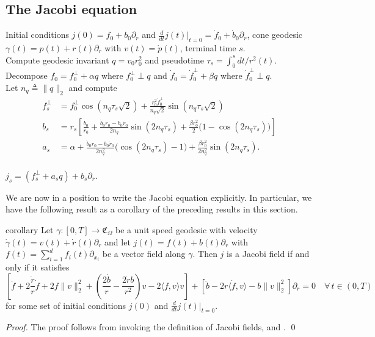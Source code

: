 \documentclass[11pt]{article}
\begin{document}
\subsection{The Jacobi equation}


\begin{algorithm}[H]
    \begin{algorithmic}[1]
        \caption{Jacobi field on $\mathfrak{C}_\Omega$}
        \label{alg: jacobi field}
        \Require Initial conditions $j(0) = f_0 + b_0\partial_r$ and $\frac{d}{dt}j(t)|_{t = 0} = \dot f_0 + \dot b_0 \partial_r$, cone geodesic $\gamma(t) = p(t) + r(t)\partial_r$ with $v(t) = \dot p(t)$, terminal time $s$.\\
        Compute geodesic invariant $q = v_0r_0^2$ and pseudotime $\tau_s = \int_0^sdt/r^2(t)$. \\
        Decompose $f_0 = f_{0}^{\perp} + \alpha q$ where $f_{0}^{\perp} \perp q$ and $\dot f_0 = \dot f_{0}^{\perp} + \beta q$ where $\dot f_{0}^\perp \perp q$.\\
        Let $n_q \triangleq \|q\|_2$ and compute 
        \begin{align*}
        f^{\perp}_s &= f_{0}^\perp\cos\left(n_q\tau_s\sqrt{2}
        \right) + \frac{r_0^2\dot f_{0}^{\perp}}{n_q\sqrt{2}}\sin\left(n_q\tau_s\sqrt{2}\right) \\
        b_s &= r_s\left[\frac{b_0}{r_0} + \frac{\dot b_0r_0 - b_0\dot r_0}{2n_q}\sin\left(2n_q\tau_s\right) + \frac{\beta r_0^2}{2} \Big(1- \cos\left(2n_q\tau_s\right)\Big)\right] \\
        a_s &= \alpha + \frac{\dot b_0r_0 - b_0\dot r_0}{2n_q^2}\Big(\cos(2n_q\tau_s)-1\Big) + \frac{\beta r_0^2}{2n_q^2}\sin(2n_q\tau_s).
        \end{align*}
        \\ \Return $j_s = \left(f^{\perp}_s + a_sq\right) + b_s\partial_r$.
    \end{algorithmic}
\end{algorithm}

We are now in a position to write the Jacobi equation explicitly. In particular, we have the following result as a corollary of the preceding results in this section.

\begin{restatable}{corollary}{} \label{full jacobi equation}
    Let $\gamma:[0, T] \rightarrow \mathfrak{C}_\Omega$ be a unit speed geodesic with velocity $\dot \gamma(t) = v(t) + \dot r(t)\partial_r$ and let $j(t) = f(t) + b(t)\partial_r$ with $f(t) = \sum_{i = 1}^df_i(t)\partial_{x_i}$ be a vector field along $\gamma$. Then $j$ is a Jacobi field if and only if it satisfies 
    \[\left[\ddot f + 2\frac{\dot r}{r}\dot f + 2f\|v\|_2^2  + \left(\frac{2\dot b}{r} - \frac{2 \dot rb}{r^2}\right)v - 2\langle f,v\rangle v\right] + \left[\ddot b - 2r\langle \dot f, v\rangle - b\|v\|_2^2\right]\partial_r = 0 \quad \forall \,t \in (0, T)\]
    for some set of initial conditions $j(0)$ and $\frac{d}{dt}j(t)|_{t = 0}$.
\end{restatable}
\noindent \textit{Proof.} The proof follows from invoking the definition of Jacobi fields,  and . \qed{}
\end{document}
